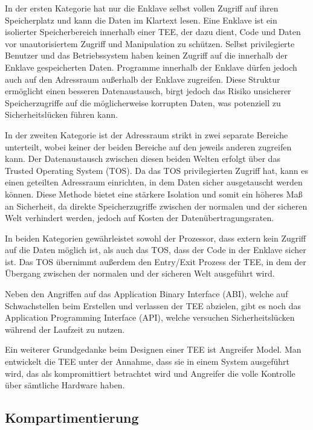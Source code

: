 In der ersten Kategorie hat nur die Enklave selbst vollen Zugriff auf ihren Speicherplatz und kann die Daten im Klartext lesen. 
Eine Enklave ist ein isolierter Speicherbereich innerhalb einer TEE, der dazu dient, Code und Daten vor unautorisiertem Zugriff und Manipulation zu schützen.
Selbst privilegierte Benutzer und das Betriebssystem haben keinen Zugriff auf die innerhalb der Enklave gespeicherten Daten. 
Programme innerhalb der Enklave dürfen jedoch auch auf den Adressraum außerhalb der Enklave zugreifen. 
Diese Struktur ermöglicht einen besseren Datenaustausch, birgt jedoch das Risiko unsicherer Speicherzugriffe auf die möglicherweise korrupten Daten, was potenziell zu Sicherheitslücken führen kann.

In der zweiten Kategorie ist der Adressraum strikt in zwei separate Bereiche unterteilt, wobei keiner der beiden Bereiche auf den jeweils anderen zugreifen kann. 
Der Datenaustausch zwischen diesen beiden Welten erfolgt über das Trusted Operating System (TOS). 
Da das TOS privilegierten Zugriff hat, kann es einen geteilten Adressraum einrichten, in dem Daten sicher ausgetauscht werden können. 
Diese Methode bietet eine stärkere Isolation und somit ein höheres Maß an Sicherheit, da direkte Speicherzugriffe zwischen der normalen und der sicheren Welt verhindert werden, jedoch auf Kosten der Datenübertragungsraten.

In beiden Kategorien gewährleistet sowohl der Prozessor, dass extern kein Zugriff auf die Daten möglich ist, als auch das TOS, dass der Code in der Enklave sicher ist. Das TOS übernimmt außerdem den Entry/Exit Prozess der TEE, in dem der Übergang zwischen der normalen und der sicheren Welt ausgeführt wird. 

Neben den Angriffen auf das Application Binary Interface (ABI), welche auf Schwachstellen beim Erstellen und verlassen der TEE abzielen, gibt es noch das Application Programming Interface (API), welche versuchen Sicherheitslücken während der Laufzeit zu nutzen\cite{TEEPaper}.

Ein weiterer Grundgedanke beim Designen einer TEE ist Angreifer Model. Man entwickelt die TEE unter der Annahme, dass sie in einem System ausgeführt wird, das als kompromittiert betrachtet wird und Angreifer die volle Kontrolle über sämtliche Hardware haben.


\subsection{Kompartimentierung}

